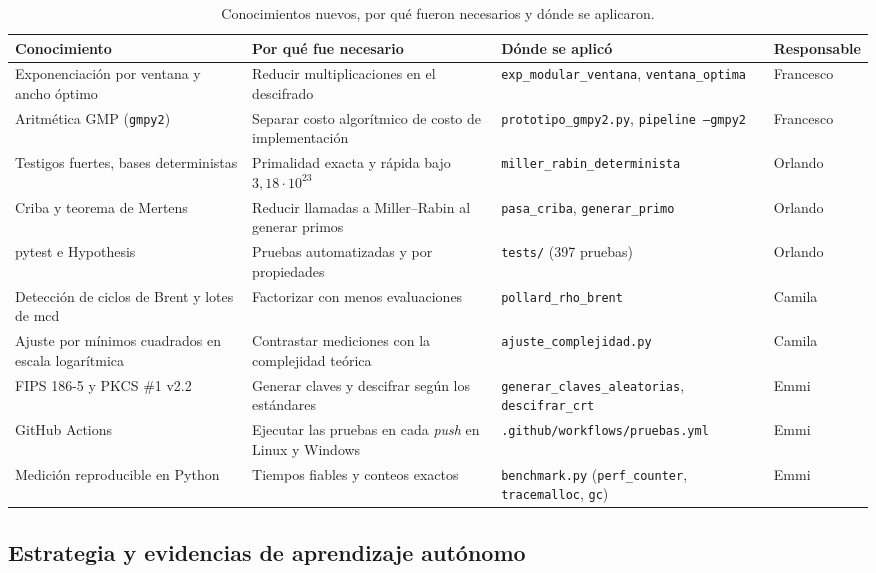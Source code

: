 \begin{table}[H]
\centering\footnotesize
\caption{Conocimientos nuevos, por qué fueron necesarios y dónde se aplicaron.}
\label{tab:conocimientos}
\begin{tabularx}{\textwidth}{@{}R{3.4cm} Y Y l@{}}
\toprule
\textbf{Conocimiento} & \textbf{Por qué fue necesario} & \textbf{Dónde se aplicó} & \textbf{Responsable}\\
\midrule
Exponenciación por ventana y ancho óptimo & Reducir multiplicaciones en el descifrado & \texttt{exp\_modular\_ventana}, \texttt{ventana\_optima} & Francesco\\
Aritmética GMP (\texttt{gmpy2}) & Separar costo algorítmico de costo de implementación & \texttt{prototipo\_gmpy2.py}, \texttt{pipeline --gmpy2} & Francesco\\
Testigos fuertes, bases deterministas & Primalidad exacta y rápida bajo $3{,}18\cdot10^{23}$ & \texttt{miller\_rabin\_determinista} & Orlando\\
Criba y teorema de Mertens & Reducir llamadas a Miller--Rabin al generar primos & \texttt{pasa\_criba}, \texttt{generar\_primo} & Orlando\\
pytest e Hypothesis & Pruebas automatizadas y por propiedades & \texttt{tests/} (397 pruebas) & Orlando\\
Detección de ciclos de Brent y lotes de mcd & Factorizar con menos evaluaciones & \texttt{pollard\_rho\_brent} & Camila\\
Ajuste por mínimos cuadrados en escala logarítmica & Contrastar mediciones con la complejidad teórica & \texttt{ajuste\_complejidad.py} & Camila\\
FIPS 186-5 y PKCS \#1 v2.2 & Generar claves y descifrar según los estándares & \texttt{generar\_claves\_\allowbreak aleatorias}, \texttt{descifrar\_crt} & Emmi\\
GitHub Actions & Ejecutar las pruebas en cada \emph{push} en Linux y Windows & \texttt{.github/\allowbreak workflows/\allowbreak pruebas.yml} & Emmi\\
Medición reproducible en Python & Tiempos fiables y conteos exactos & \texttt{benchmark.py} (\texttt{perf\_\allowbreak counter}, \texttt{trace\allowbreak malloc}, \texttt{gc}) & Emmi\\
\bottomrule
\end{tabularx}
\end{table}

\subsection{Estrategia y evidencias de aprendizaje autónomo}

